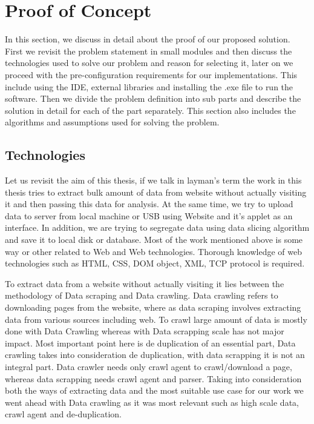 \documentclass[article,type=msc,colorback,accentcolor=tud9c,twoside,11pt]{tudthesis}
\begin{document}
	\section{Proof of Concept}
	In this section, we discuss in detail about the proof of our proposed solution. First we revisit the problem statement in small modules and then discuss the technologies used to solve our problem and reason for selecting it, later on we proceed with the pre-configuration requirements for our implementations. This include using the IDE, external libraries and installing the .exe file to run the software. Then we divide the problem definition into sub parts and describe the solution in detail for each of the part separately. This section also includes the algorithms and assumptions used for solving the problem.
	
	\subsection{Technologies}
	Let us revisit the aim of this thesis, if we talk in layman's term the work in this thesis tries to extract bulk amount of data from website without actually visiting it and then passing this data for analysis. At the same time, we try to upload data to server from local machine or USB using Website and it's applet as an interface. In addition, we are trying to segregate data using data slicing algorithm and save it to local disk or database. Most of the work mentioned above is some way or other related to Web and Web technologies. Thorough knowledge of web technologies such as HTML, CSS, DOM object, XML, TCP protocol is required.
	
	To extract data from a website without actually visiting it lies between the methodology of Data scraping and Data crawling. Data crawling refers to downloading pages from the website, where as data scraping involves extracting data from various sources including web. To crawl  large amount of data is mostly done with Data Crawling whereas with Data scrapping scale has not major impact. Most important point here is de duplication of an essential part, Data crawling takes into consideration de duplication, with data scrapping it is not an integral part. Data crawler needs only crawl agent to crawl/download a page, whereas data scrapping needs crawl agent and parser. Taking into consideration both the ways of extracting data and the most suitable use case for our work we went ahead with Data crawling as it was most relevant such as high scale data, crawl agent and de-duplication.
	
\end{document}
